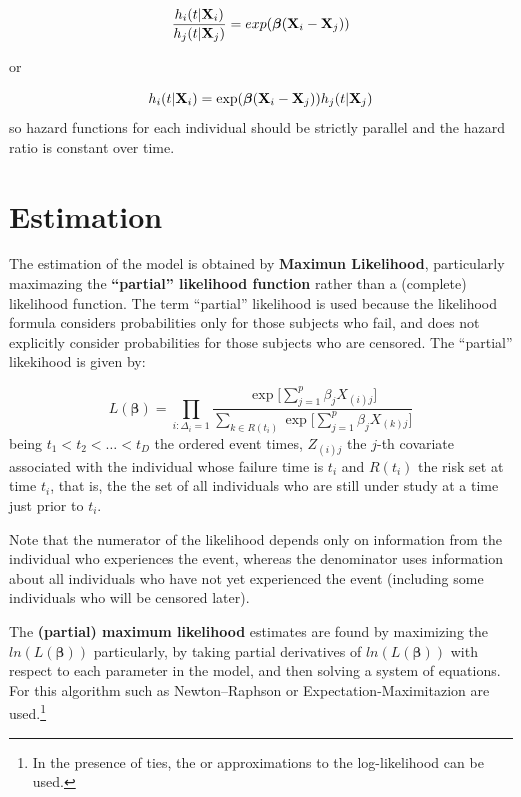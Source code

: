 \documentclass[]{book}
\let\rmarkdownfootnote\footnote%
\def\footnote{\protect\rmarkdownfootnote}
\theoremstyle{definition}
\theoremstyle{definition}
\theoremstyle{definition}
\theoremstyle{remark}
\begin{document}
\[
\frac{h_i(t|\textbf X_i)}{h_j(t|\textbf X_j)} = exp(\boldsymbol \beta(\textbf X_i - \textbf X_j))
\]

or

\[
h_i(t|\textbf X_i) = \exp( \boldsymbol \beta(\textbf X_i - \textbf X_j)) h_j(t|\textbf X_j)
\] so hazard functions for each individual should be strictly parallel
and the hazard ratio is constant over time.

\section{Estimation}\label{estimation}

The estimation of the model is obtained by \textbf{Maximun Likelihood},
particularly maximazing the \textbf{``partial'' likelihood function}
rather than a (complete) likelihood function. The term ``partial''
likelihood is used because the likelihood formula considers
probabilities only for those subjects who fail, and does not explicitly
consider probabilities for those subjects who are censored. The
``partial'' likekihood is given by:

\[
L(\boldsymbol \beta) = \prod_{i:\Delta_i = 1} \frac{\exp\bigg[ \sum_{j=1}^{p}\beta_j X_{(i)j} \bigg]}{\sum_{k \in R(t_i)} \exp \bigg[ \sum_{j=1}^{p}\beta_j X_{(k)j} \bigg]}
\] being \(t_1 < t_2 < \ldots < t_D\) the ordered event times,
\(Z_{(i)j}\) the \(j\)-th covariate associated with the individual whose
failure time is \(t_i\) and \(R(t_i)\) the risk set at time \(t_i\),
that is, the the set of all individuals who are still under study at a
time just prior to \(t_i\).

Note that the numerator of the likelihood depends only on information
from the individual who experiences the event, whereas the denominator
uses information about all individuals who have not yet experienced the
event (including some individuals who will be censored later).

The \textbf{(partial) maximum likelihood} estimates are found by
maximizing the \(ln (L(\boldsymbol \beta))\) particularly, by taking
partial derivatives of \(ln (L(\boldsymbol \beta))\) with respect to
each parameter in the model, and then solving a system of equations. For
this algorithm such as Newton--Raphson \citep{doi:10.1137/1037125} or
Expectation-Maximitazion \citep{10.2307/2984875} are used.\footnote{In
  the presence of ties, the \citet{10.2307/1402659} or
  \citet{doi:10.1080/01621459.1977.10480613} approximations to the
  log-likelihood can be used.}
\end{document}
